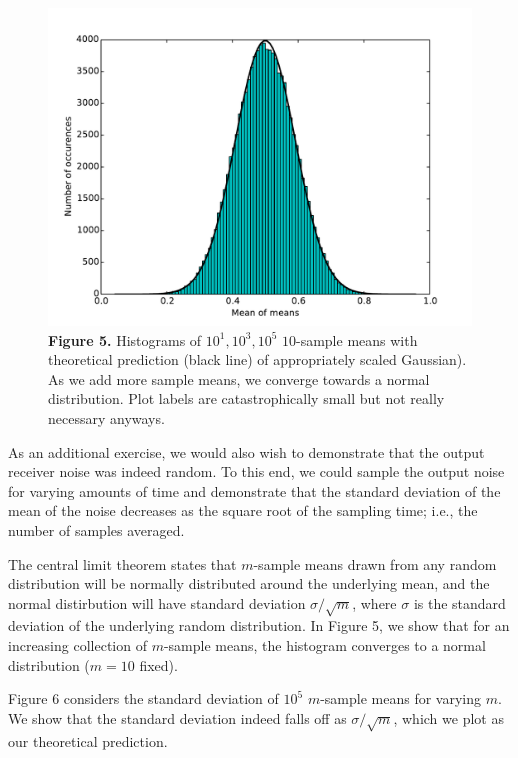 \documentclass[11pt]{article}
\begin{document}
\begin{figure}[h]
    \includegraphics[scale=0.25]{scripts/hist_normal_m=10_n=100000.pdf} \\
    \textbf{Figure 5.} Histograms of $10^1, 10^3, 10^5$ $10$-sample means
    with theoretical prediction (black line) of appropriately scaled Gaussian).
    As we add more sample means, we converge towards a normal distribution.
    Plot labels are catastrophically small but not really necessary anyways.
\end{figure}

As an additional exercise, we would also wish to demonstrate that the output
receiver noise was indeed random.  To this end, we could sample the output
noise for varying amounts of time and demonstrate that the standard deviation
of the mean of the noise decreases as the square root of the sampling time;
i.e., the number of samples averaged.

The central limit theorem states that $m$-sample means drawn from any random
distribution will be normally distributed around the underlying mean, and the
normal distirbution will have standard deviation $\sigma / \sqrt{m}$, where
$\sigma$ is the standard deviation of the underlying random distribution.  In
Figure 5, we show that for an increasing collection of $m$-sample means, the
histogram converges to a normal distribution ($m = 10$ fixed).

Figure 6 considers the standard deviation of $10^5$ $m$-sample means for
varying $m$.  We show that the standard deviation indeed falls off as $\sigma
/ \sqrt{m}$, which we plot as our theoretical prediction.
\end{document}
